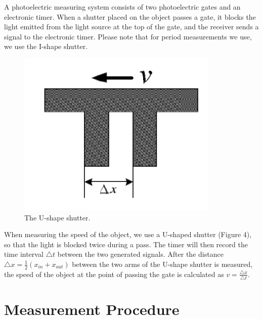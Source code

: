 \documentclass[12pt]{article}
\begin{document}
\par A photoelectric measuring system consists of two photoelectric gates and an electronic timer. When a shutter placed on the object passes a gate, it blocks the light emitted from the light source at the top of the gate, and the receiver sends a signal to the electronic timer. Please note that for period measurements we use, we use the I-shape shutter.
\begin{figure}[H]
\centering
\includegraphics[scale=0.5]{P4.jpg}
\caption{The U-shape shutter.}
\end{figure}
When measuring the speed of the object, we use a U-shaped shutter (Figure 4), so
that the light is blocked twice during a pass. The timer will then record the time interval $\bigtriangleup t$ between the two generated signals. After the distance $\bigtriangleup x=\frac{1}{2}(x_{in}+x_{out})$ between the two arms of the U-shape shutter is measured, the speed of the object at the point of passing the gate is calculated as $v=\frac{\bigtriangleup x}{\bigtriangleup t}$.	
\section{Measurement Procedure}
\end{document}
